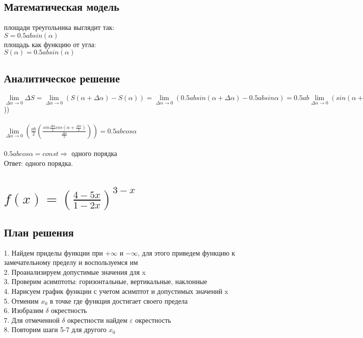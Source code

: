 \documentclass{article}
\begin{document}
\subsection{Математическая модель}
     площади треугольника выглядит так: \\
    $S = 0.5ab sin(\alpha)$ \\
     площадь как функцию от угла: \\
    $S(\alpha) = 0.5ab sin(\alpha)$
\subsection{Аналитическое решение}
    $\lim\limits_{\Delta\alpha \to 0} \Delta S = \lim\limits_{\Delta\alpha \to 0} (S(\alpha + \Delta\alpha) - S(\alpha)) = \lim\limits_{\Delta\alpha \to 0} (0.5 ab sin(\alpha + \Delta \alpha) - 0.5 ab sin \alpha) = 0.5 ab \lim\limits_{\Delta\alpha \to 0} (sin(\alpha + \Delta\alpha) - sin \alpha) = ab \lim\limits_{\Delta\alpha \to 0} (sin \frac{\Delta\alpha}{2}cos(\alpha + \frac{\Delta\alpha}{2}$)) \\ \\
    \large$\lim\limits_{\Delta\alpha \to 0} (\frac{ab}{2}(\frac{sin\frac{\Delta\alpha}{2}cos(\alpha + \frac{\Delta\alpha}{2})}{\frac{\Delta\alpha}{2}})) = 0.5 ab cos \alpha$ \\ \\
    $0.5 ab cos\alpha = const \Rightarrow$ одного порядка \\
    Ответ: одного порядка.
    
\newpage
    
    \section{\Large$f(x) = (\frac{4 - 5x}{1 - 2x})^{3 - x}$}

\subsection{План решения}
1. Найдем приделы функции при $+ \infty$ и $ -\infty$, для этого приведем функцию к замечательному пределу и воспользуемся им \\
2. Проанализируем допустимые значения для x \\
3. Проверим асимптоты: горизонтальные, вертикальные, наклонные \\
4. Нарисуем график функции с учетом асимптот и допустимых значений x \\
5. Отменим $x_0$ в точке где функция достигает своего предела \\
6. Изобразим $\delta$ окрестность \\
7. Для отмеченной $\delta$ окрестности найдем $\varepsilon$ окрестность \\
8. Повторим шаги 5-7 для другого $x_0$
\end{document}
